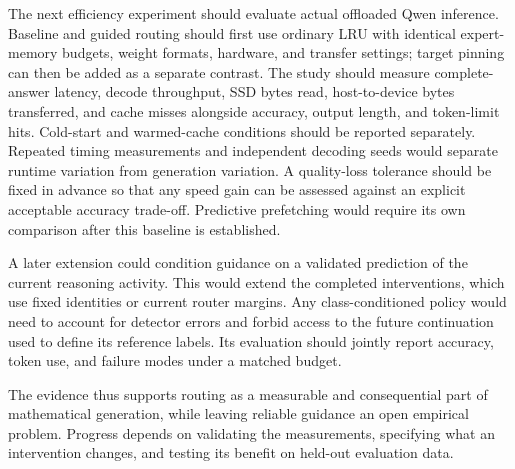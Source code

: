 \documentclass[12pt,a4paper,twoside,openright]{book}
\begin{document}
The next efficiency experiment should evaluate actual offloaded Qwen
inference. Baseline and guided routing should first use ordinary LRU with
identical expert-memory budgets, weight formats, hardware, and transfer
settings; target pinning can then be added as a separate contrast. The
study should measure complete-answer latency, decode throughput, SSD bytes
read, host-to-device bytes transferred, and cache misses alongside accuracy,
output length, and token-limit hits. Cold-start and warmed-cache conditions
should be reported separately. Repeated timing measurements and independent
decoding seeds would separate runtime variation from generation variation.
A quality-loss tolerance should be fixed in advance so that any speed gain
can be assessed against an explicit acceptable accuracy trade-off. Predictive
prefetching would require its own comparison after this baseline is established.

A later extension could condition guidance on a validated prediction of the
current reasoning activity. This would extend the completed interventions,
which use fixed identities or current router margins. Any class-conditioned
policy would need to account for detector errors and forbid access to the
future continuation used to define its reference labels. Its evaluation should
jointly report accuracy, token use, and failure modes under a matched budget.

The evidence thus supports routing as a measurable and consequential part of
mathematical generation, while leaving reliable guidance an open empirical
problem. Progress depends on validating the measurements, specifying what an
intervention changes, and testing its benefit on held-out evaluation data.

\cleardoublepage
{}
{}
\printbibliography
\end{document}
